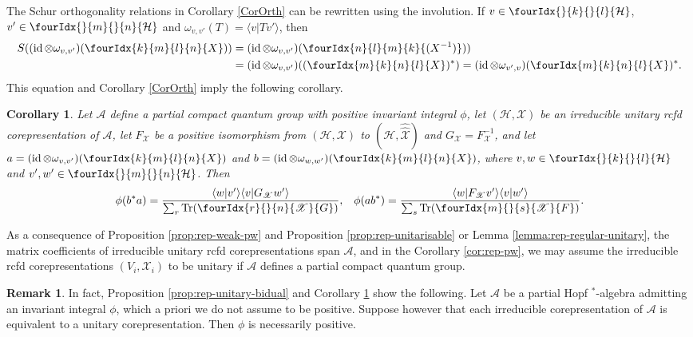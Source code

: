 \documentclass[10pt]{article}
\DeclareMathOperator{\id}{id}
\newcommand{\dualco}[1]{\hat{#1}}
\newcommand{\Hsp}{\mathcal{H}}
\newcommand{\Tr}{\mathrm{Tr}}
\newcommand{\Gr}[5]{\fourIdx{#2}{#4}{#3}{#5}{#1}}%
\newcommand{\Gru}[3]{\Gr{#1}{}{}{#2}{#3}}
\newtheorem{Cor}[Theorem]{Corollary}
\theoremstyle{definition}
\newtheorem{Rem}[Theorem]{Remark}
\numberwithin{equation}{section}
\begin{document}
The Schur orthogonality relations in Corollary \ref{CorOrth} can be
rewritten using the involution. If $v \in \Gru{\Hsp}{k}{l}$, $v' \in \Gru{\Hsp}{m}{n}$
and $\omega_{v,v'}(T) = \langle v|Tv'\rangle$, then 
\begin{align*}
  S((\id \otimes \omega_{v,v'})(\Gr{X}{k}{l}{m}{n})) &=
  (\id \otimes \omega_{v,v'}) (\Gr{(X^{-1})}{n}{m}{l}{k})) \\ & =
  (\id \otimes \omega_{v,v'})( (\Gr{X}{m}{n}{k}{l})^{*}) =
  (\id \otimes \omega_{v',v})(\Gr{X}{m}{n}{k}{l})^{*}.
\end{align*}
This equation and Corollary \ref{CorOrth} imply the following corollary.
\begin{Cor}\label{cor:rep-unitary-schur-orthogonality}
  Let $\mathscr{A}$ define a partial compact quantum group with
  positive invariant integral $\phi$, let $(\Hsp,\mathscr{X})$ be an irreducible
  unitary rcfd corepresentation of $\mathscr{A}$, let $F_{\mathscr{X}}$ be a positive
  isomorphism from $(\Hsp,\mathscr{X})$ to
  $(\Hsp,\dualco{\dualco{\mathscr{X}}})$ and
  $G_{\mathscr{X}}=F^{-1}_{{\mathscr{X}}}$, and let $a=(\id \otimes
  \omega_{v,v'})(\Gr{X}{k}{l}{m}{n})$ and $b=(\id \otimes
  \omega_{w,w'})(\Gr{X}{k}{l}{m}{n})$, where $v,w \in
  \Gru{\Hsp}{k}{l}$ and $v',w' \in \Gru{\Hsp}{m}{n}$.  Then
\begin{align*}
  \phi(b^{*}a) &= \frac{\langle w|v'\rangle\langle v|G_{\mathscr{X}}w'\rangle}{\sum_{r}
    \Tr(\Gr{G}{r}{n}{}{\mathscr{X}})}, & \phi(ab^{*}) = \frac{\langle
    w|F_{\mathscr{X}}v'\rangle \langle v|w'\rangle}{\sum_{s}
    \Tr(\Gr{F}{m}{s}{}{\mathscr{X}})}.
\end{align*}
\end{Cor}
As a consequence of Proposition \ref{prop:rep-weak-pw} and Proposition
\ref{prop:rep-unitarisable} or Lemma \ref{lemma:rep-regular-unitary},
the matrix coefficients of irreducible unitary rcfd corepresentations
span $\mathscr{A}$, and in the Corollary \ref{cor:rep-pw}, we may
assume the irreducible rcfd corepresentations
$(V_{i},\mathscr{X}_{i})$ to be unitary if $\mathscr{A}$
defines a partial compact quantum group.

\begin{Rem}\label{RemPos} In fact, Proposition \ref{prop:rep-unitary-bidual} and Corollary \ref{cor:rep-unitary-schur-orthogonality} show the following. Let $\mathscr{A}$ be a partial Hopf $^*$-algebra admitting an invariant integral $\phi$, which a priori we do not assume to be positive. Suppose however that each irreducible corepresentation of $\mathscr{A}$ is equivalent to a unitary corepresentation. Then $\phi$ is necessarily positive.
\end{Rem} 
\end{document}
